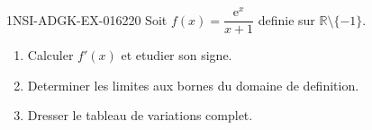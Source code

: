 \begin{exercice}{1NSI-ADGK-EX-016}{2}{20}
Soit $f(x) = \dfrac{\mathrm{e}^x}{x+1}$ definie sur $\mathbb{R} \setminus \{-1\}$.
\begin{enumerate}
  \item Calculer $f'(x)$ et etudier son signe.
  \item Determiner les limites aux bornes du domaine de definition.
  \item Dresser le tableau de variations complet.
\end{enumerate}

\end{exercice}
